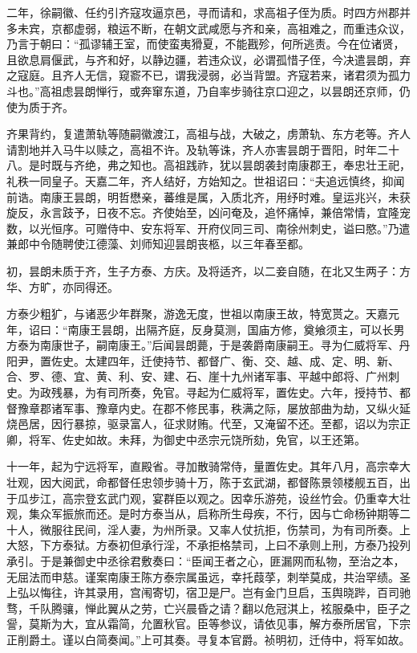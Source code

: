 \documentclass[]{article}
\begin{document}
二年，徐嗣徽、任约引齐寇攻逼京邑，寻而请和，求高祖子侄为质。时四方州郡并多未宾，京都虚弱，粮运不断，在朝文武咸愿与齐和亲，高祖难之，而重违众议，乃言于朝曰：``孤谬辅王室，而使蛮夷猾夏，不能戡殄，何所逃责。今在位诸贤，且欲息肩偃武，与齐和好，以静边疆，若违众议，必谓孤惜子侄，今决遣昙朗，弃之寇庭。且齐人无信，窥窬不已，谓我浸弱，必当背盟。齐寇若来，诸君须为孤力斗也。''高祖虑昙朗惮行，或奔窜东道，乃自率步骑往京口迎之，以昙朗还京师，仍使为质于齐。

齐果背约，复遣萧轨等随嗣徽渡江，高祖与战，大破之，虏萧轨、东方老等。齐人请割地并入马牛以赎之，高祖不许。及轨等诛，齐人亦害昙朗于晋阳，时年二十八。是时既与齐绝，弗之知也。高祖践祚，犹以昙朗袭封南康郡王，奉忠壮王祀，礼秩一同皇子。天嘉二年，齐人结好，方始知之。世祖诏曰：``夫追远慎终，抑闻前诰。南康王昙朗，明哲懋亲，蕃维是属，入质北齐，用纾时难。皇运兆兴，未获旋反，永言跂予，日夜不忘。齐使始至，凶问奄及，追怀痛悼，兼倍常情，宜隆宠数，以光恒序。可赠侍中、安东将军、开府仪同三司、南徐州刺史，谥曰愍。''乃遣兼郎中令随聘使江德藻、刘师知迎昙朗丧柩，以三年春至都。

初，昙朗未质于齐，生子方泰、方庆。及将适齐，以二妾自随，在北又生两子：方华、方旷，亦同得还。

方泰少粗犷，与诸恶少年群聚，游逸无度，世祖以南康王故，特宽贳之。天嘉元年，诏曰：``南康王昙朗，出隔齐庭，反身莫测，国庙方修，奠飨须主，可以长男方泰为南康世子，嗣南康王。''后闻昙朗薨，于是袭爵南康嗣王。寻为仁威将军、丹阳尹，置佐史。太建四年，迁使持节、都督广、衡、交、越、成、定、明、新、合、罗、德、宜、黄、利、安、建、石、崖十九州诸军事、平越中郎将、广州刺史。为政残暴，为有司所奏，免官。寻起为仁威将军，置佐史。六年，授持节、都督豫章郡诸军事、豫章内史。在郡不修民事，秩满之际，屡放部曲为劫，又纵火延烧邑居，因行暴掠，驱录富人，征求财贿。代至，又淹留不还。至都，诏以为宗正卿，将军、佐史如故。未拜，为御史中丞宗元饶所劾，免官，以王还第。

十一年，起为宁远将军，直殿省。寻加散骑常侍，量置佐史。其年八月，高宗幸大壮观，因大阅武，命都督任忠领步骑十万，陈于玄武湖，都督陈景领楼舰五百，出于瓜步江，高宗登玄武门观，宴群臣以观之。因幸乐游苑，设丝竹会。仍重幸大壮观，集众军振旅而还。是时方泰当从，启称所生母疾，不行，因与亡命杨钟期等二十人，微服往民间，淫人妻，为州所录。又率人仗抗拒，伤禁司，为有司所奏。上大怒，下方泰狱。方泰初但承行淫，不承拒格禁司，上曰不承则上刑，方泰乃投列承引。于是兼御史中丞徐君敷奏曰：``臣闻王者之心，匪漏网而私物，至治之本，无屈法而申慈。谨案南康王陈方泰宗属虽远，幸托葭莩，刺举莫成，共治罕绩。圣上弘以悔往，许其录用，宫闱寄切，宿卫是尸。岂有金门旦启，玉舆晓跸，百司驰骛，千队腾骧，惮此翼从之劳，亡兴晨昏之请？翻以危冠淇上，袨服桑中，臣子之諐，莫斯为大，宜从霜简，允置秋官。臣等参议，请依见事，解方泰所居官，下宗正削爵土。谨以白简奏闻。''上可其奏。寻复本官爵。祯明初，迁侍中，将军如故。
\end{document}
